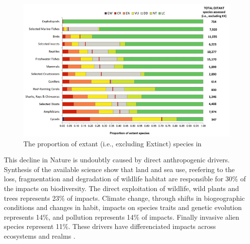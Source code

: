  \begin{figure}[H]
    \centering
    \includegraphics[width=0.8\linewidth]{figures/intro/IUCN_redlist}
    \caption{The proportion of extant (i.e., excluding Extinct) species in \citet{IUCN_redlist_2024}}
    \label{fig:intro_iucn}
\end{figure}

This decline in Nature is undoubtly caused by direct anthropogenic drivers. Synthesis of the available science \citep{ipbes_2022_6417333} show that land and sea use, reefering to the loss, fragmentation and degradation of wildlife habitat are responsible for 30\% of the impacts on biodiversity. The direct exploitation of wildlife, wild plants and trees represents 23\% of impacts. Climate change, through shifts in biogeographic conditions and changes in habit, impacts on species traits and genetic evolution represents 14\%, and pollution represents 14\% of impacts. Finally invasive alien species represent 11\%. These drivers have differenciated impacts across ecosystems and realms \citep{ipbes_2022_6417333}. 

